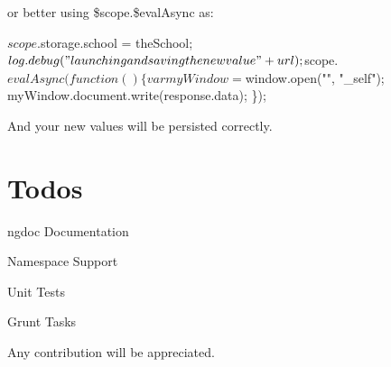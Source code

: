 or better using {\ttfamily \$scope.\$eval\+Async} as\+:


\begin{DoxyCode}
$scope.$storage.school = theSchool;
$log.debug("launching and saving the new value" + url);
$scope.$evalAsync(function()\{
   var myWindow = $window.open("", "\_self");
   myWindow.document.write(response.data);
\});
\end{DoxyCode}


And your new values will be persisted correctly.

\section*{Todos }


\begin{DoxyItemize}
\item ngdoc Documentation
\item Namespace Support
\item Unit Tests
\item Grunt Tasks
\end{DoxyItemize}

Any contribution will be appreciated. 